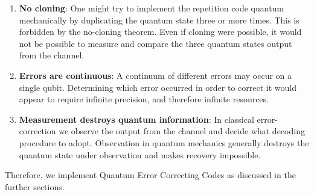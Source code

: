 \documentclass[12pt]{report}
\begin{document}
\begin{enumerate}
\item \textbf{No cloning}: One might try to implement the repetition code quantum mechanically by duplicating the quantum state three or more times. This is forbidden by the no-cloning theorem. Even if cloning were possible, it would not be possible to measure and compare the three quantum states output from the channel.
\item \textbf{Errors are continuous}: A continuum of different errors may occur on a single qubit. Determining which error occurred in order to correct it would appear to require infinite precision, and therefore infinite resources.
\item \textbf{Measurement destroys quantum information}: In classical error-correction we observe the output from the channel and decide what decoding procedure to adopt. Observation in quantum mechanics generally destroys the quantum state under observation and makes recovery impossible.
\end{enumerate}
Therefore, we implement Quantum Error Correcting Codes as discussed in the further sections.
\end{document}
